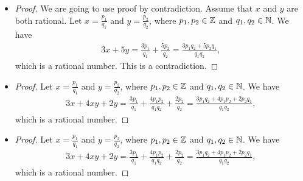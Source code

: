 \documentclass[8pt,twocolumn]{article}
\begin{document}
\begin{Answer}[number=2.2.10]
  \begin{itemize}
    \item
      \begin{proof}
        We are going to use proof by contradiction. Assume that $x$ and $y$ are
        both rational. Let $x=\frac{p_1}{q_1}$ and $y=\frac{p_2}{q_2}$, where
        $p_1,p_2\in \mathbb{Z}$ and $q_1,q_2\in \mathbb{N}$. We have
        \begin{align*}
          3x + 5y = \frac{3p_1}{q_1} + \frac{5p_2}{q_2} =
          \frac{3p_1q_2+5p_2q_1}{q_1q_2},
        \end{align*}
        which is a rational number. This is a contradiction.
      \end{proof}
    \item
      \begin{proof}
        Let $x=\frac{p_1}{q_1}$ and $y=\frac{p_2}{q_2}$, where
        $p_1,p_2\in \mathbb{Z}$ and $q_1,q_2\in \mathbb{N}$. We have
        \begin{align*}
          3x + 4xy + 2y = \frac{3p_1}{q_1} + \frac{4p_1p_2}{q_1q_2} +
          \frac{2p_2}{q_2} = \frac{3p_1q_2+4p_1p_2+2p_2q_1}{q_1q_2},
        \end{align*}
        which is a rational number.
      \end{proof}
    \item
      \begin{proof}
        Let $x=\frac{p_1}{q_1}$ and $y=\frac{p_2}{q_2}$, where
        $p_1,p_2\in \mathbb{Z}$ and $q_1,q_2\in \mathbb{N}$. We have
        \begin{align*}
          3x + 4xy + 2y = \frac{3p_1}{q_1} + \frac{4p_1p_2}{q_1q_2} +
          \frac{2p_2}{q_2} = \frac{3p_1q_2+4p_1p_2+2p_2q_1}{q_1q_2},
        \end{align*}
        which is a rational number.
      \end{proof}
  \end{itemize}
\end{Answer}
\end{document}
